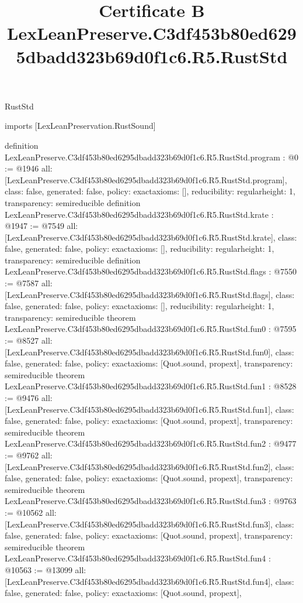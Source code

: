 \begin{lexlean}{RustStd}
\title{Certificate B LexLeanPreserve.C3df453b80ed6295dbadd323b69d0f1c6.R5.RustStd}
\begin{coremodule}
imports [LexLeanPreservation.RustSound]

definition LexLeanPreserve.C3df453b80ed6295dbadd323b69d0f1c6.R5.RustStd.program : @0 := @1946 {
  all: [LexLeanPreserve.C3df453b80ed6295dbadd323b69d0f1c6.R5.RustStd.program],
  class: false,
  generated: false,
  policy: exact{axioms: []},
  reducibility: regular{height: 1},
  transparency: semireducible
}
definition LexLeanPreserve.C3df453b80ed6295dbadd323b69d0f1c6.R5.RustStd.krate : @1947 := @7549 {
  all: [LexLeanPreserve.C3df453b80ed6295dbadd323b69d0f1c6.R5.RustStd.krate],
  class: false,
  generated: false,
  policy: exact{axioms: []},
  reducibility: regular{height: 1},
  transparency: semireducible
}
definition LexLeanPreserve.C3df453b80ed6295dbadd323b69d0f1c6.R5.RustStd.flags : @7550 := @7587 {
  all: [LexLeanPreserve.C3df453b80ed6295dbadd323b69d0f1c6.R5.RustStd.flags],
  class: false,
  generated: false,
  policy: exact{axioms: []},
  reducibility: regular{height: 1},
  transparency: semireducible
}
theorem LexLeanPreserve.C3df453b80ed6295dbadd323b69d0f1c6.R5.RustStd.fun0 : @7595 := @8527 {
  all: [LexLeanPreserve.C3df453b80ed6295dbadd323b69d0f1c6.R5.RustStd.fun0],
  class: false,
  generated: false,
  policy: exact{axioms: [Quot.sound, propext]},
  transparency: semireducible
}
theorem LexLeanPreserve.C3df453b80ed6295dbadd323b69d0f1c6.R5.RustStd.fun1 : @8528 := @9476 {
  all: [LexLeanPreserve.C3df453b80ed6295dbadd323b69d0f1c6.R5.RustStd.fun1],
  class: false,
  generated: false,
  policy: exact{axioms: [Quot.sound, propext]},
  transparency: semireducible
}
theorem LexLeanPreserve.C3df453b80ed6295dbadd323b69d0f1c6.R5.RustStd.fun2 : @9477 := @9762 {
  all: [LexLeanPreserve.C3df453b80ed6295dbadd323b69d0f1c6.R5.RustStd.fun2],
  class: false,
  generated: false,
  policy: exact{axioms: [Quot.sound, propext]},
  transparency: semireducible
}
theorem LexLeanPreserve.C3df453b80ed6295dbadd323b69d0f1c6.R5.RustStd.fun3 : @9763 := @10562 {
  all: [LexLeanPreserve.C3df453b80ed6295dbadd323b69d0f1c6.R5.RustStd.fun3],
  class: false,
  generated: false,
  policy: exact{axioms: [Quot.sound, propext]},
  transparency: semireducible
}
theorem LexLeanPreserve.C3df453b80ed6295dbadd323b69d0f1c6.R5.RustStd.fun4 : @10563 := @13099 {
  all: [LexLeanPreserve.C3df453b80ed6295dbadd323b69d0f1c6.R5.RustStd.fun4],
  class: false,
  generated: false,
  policy: exact{axioms: [Quot.sound, propext]},
}
\end{coremodule}
\end{lexlean}
